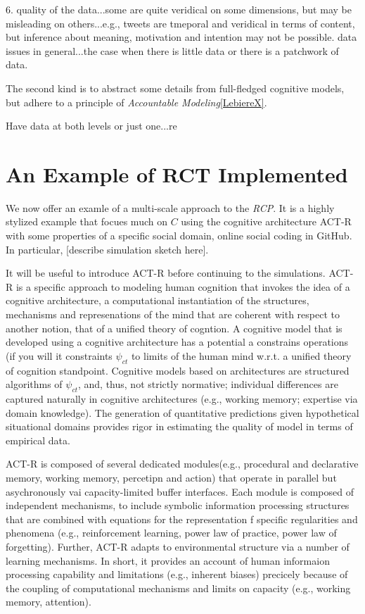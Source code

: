 \documentclass{article}
\begin{document}
6. quality of the data...some are quite veridical on some dimensions, but may be misleading on others...e.g., tweets are tmeporal and veridical in terms of content, but inference about meaning, motivation and intention may not be possible.  data issues in general...the case when there is little data or there is a patchwork of data.



The second kind is to abstract some details from full-fledged cognitive models, but adhere to a principle of \textit{Accountable Modeling}\ref{LebiereX}.

Have data at both levels or just one...re
  

\section{An Example of RCT Implemented}
We now offer an examle of a multi-scale approach to the \textit{RCP}.  It is a highly stylized example that focues much on $C$ using the cognitive architecture ACT-R with some properties of a specific social domain, online social coding in GitHub.  In particular, [describe simulation sketch here]. 

It will be useful to introduce ACT-R before continuing to the simulations.  ACT-R is a specific approach to modeling human cognition that invokes the idea of a cognitive architecture, a computational instantiation of the structures, mechanisms and represenations of the mind that are coherent with respect to another notion, that of a unified theory of cogntion\cite{newell1990}. A cognitive model that is developed using a cognitive architecture has a potential a constrains operations (if you will it constraints $\psi_{ct}$ to limits of the human mind w.r.t. a unified theory of cognition standpoint.  Cognitive models based on architectures are structured algorithms of $\psi_{ct}$, and, thus, not strictly normative; individual differences are captured naturally in cognitive architectures (e.g., working memory; expertise via domain knowledge).  The generation of quantitative predictions given hypothetical situational domains provides rigor in estimating the quality of model in terms of empirical data.

ACT-R is composed of several dedicated modules(e.g., procedural and declarative memory, working memory, percetipn and action) that operate in parallel but asychronously vai capacity-limited buffer interfaces.  Each module is composed of independent mechanisms, to include symbolic information processing structures that are combined with equations for the representation f specific regularities and phenomena (e.g., reinforcement learning, power law of practice, power law of forgetting).  Further, ACT-R adapts to environmental structure via a number of learning mechanisms.  In short, it provides an account of human informaion processing capability and limitations (e.g., inherent biases) precicely because of the coupling of computational mechanisms and limits on capacity (e.g., working memory, attention).   
\end{document}
